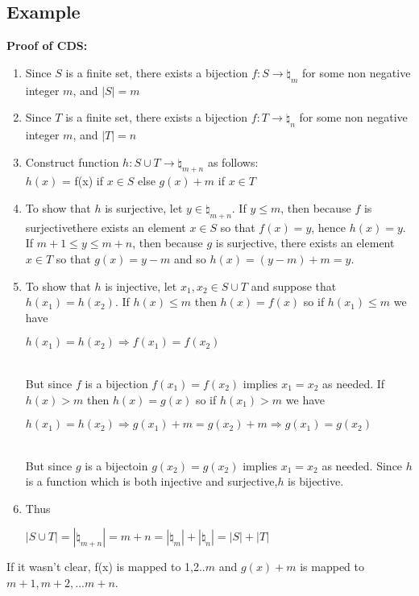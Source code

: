 \documentclass[12pt]{report}
\begin{document}
		\subsection{Example}
			\textbf{Proof of CDS:}
			\begin{enumerate}
				\item Since $S$ is a finite set, there exists a bijection $f:S \rightarrow \natural_m$ for some non negative integer $m$, and $|S| = m$
				\item Since $T$ is a finite set, there exists a bijection $f:T \rightarrow \natural_n$ for some non negative integer $m$, and $|T| = n$
				\item Construct function $h:S \cup T \rightarrow \natural_{m+n}$ as follows: \\
				$h(x)$ = f(x) if $x \in S$ else $g(x) + m$ if $x \in T$
				\item To show that $h$ is surjective, let $y \in \natural_{m+n}$. If $y \leq m$, then because $f$ is surjectivethere exists an element $x \in S$ so that $f(x) = y$, hence $h(x) = y$. If $m+1 \leq y \leq m + n$, then because $g$ is surjective, there exists an element $x \in T$ so that $g(x) = y-m$ and so $h(x) = (y-m) + m = y$.
				\item To show that $h$ is injective, let $x_1, x_2 \in S \cup T$ and suppose that $h(x_1) = h(x_2)$. If $h(x) \leq m$ then $h(x) = f(x)$ so if $h(x_1) \leq m$ we have\\
				\centerline{$h(x_1) = h(x_2) \Rightarrow f(x_1) = f(x_2)$} \\
				But since $f$ is a bijection $f(x_1) = f(x_2)$ implies $x_1 = x_2$ as needed. If $h(x) > m$ then $h(x) = g(x)$ so if $h(x_1) > m$ we have \\
				\centerline{$h(x_1) = h(x_2) \Rightarrow g(x_1) + m = g(x_2) + m \Rightarrow g(x_1) = g(x_2)$} \\
				But since $g$ is a bijectoin $g(x_2) = g(x_2) $ implies $x_1 = x_2$ as needed. Since $h$ is a function which is both injective and surjective,$h$ is bijective.
				\item Thus \\
				\centerline{$|S \cup T| = |\natural_{m+n}| = m+n=|\natural_m| + |\natural_n| = |S| + |T|$}
			\end{enumerate}
			If it wasn't clear, f(x) is mapped to 1,2..$m$ and $g(x) + m$ is mapped to $m+1, m+2,$...$m+n$.
			
\end{document}
